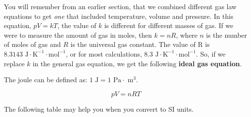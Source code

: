 You will remember from an earlier section, that we combined different gas law equations to get \textit{one} that included temperature, volume and pressure. In this equation, $pV = kT$, the value of $k$ is different for different masses of gas. If we were to measure the amount of gas in moles, then $k = nR$, where $n$ is the number of moles of gas and $R$ is the universal gas constant. The value of R is $8.3143 \text{ J} \cdot \text{K}^{-1} \cdot \text{mol}^{-1}$, or for most calculations, $8.3 \text{ J} \cdot \text{K}^{-1} \cdot \text{mol}^{-1}$. So, if we replace $k$ in the general gas equation, we get the following \textbf{ideal gas equation}.

The joule can be defined as: $1 \text{ J} = 1 \text{ Pa} \cdot \text{ m}^{3}$. 


\begin{equation*}
pV = nRT
\end{equation*}

The following table may help you when you convert to SI units.

